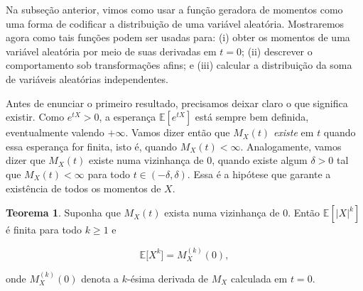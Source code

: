 \documentclass[12pt,portuguese]{article}
\theoremstyle{definition}
\newtheorem{theorem}{Teorema}
\theoremstyle{plainexercise}
\theoremstyle{starredexercise}
\theoremstyle{definition}
\begin{document}
Na subseção anterior, vimos como usar a função geradora de momentos como uma forma de
codificar a distribuição de uma variável aleatória. Mostraremos agora como tais funções
podem ser usadas para: (i) obter os momentos de uma variável aleatória por meio de suas derivadas em
$t=0$; (ii) descrever o comportamento sob transformações afins; e (iii) calcular a distribuição da soma de
variáveis aleatórias independentes.

Antes de enunciar o primeiro resultado, precisamos deixar claro o que significa
existir. Como $e^{tX}>0$, a esperança $\mathbb{E}[e^{tX}]$ está sempre bem
definida, eventualmente valendo $+\infty$. Vamos dizer então que $M_X(t)$
\emph{existe} em $t$ quando essa esperança for finita, isto é, quando
$M_X(t)<\infty$. Analogamente, vamos dizer que $M_X(t)$ existe numa vizinhança de $0$, 
quando existe algum  $\delta>0$ tal que $M_X(t)<\infty$ para todo $t\in(-\delta,\delta)$. Essa
é a hipótese que garante a existência de todos os momentos de $X$.

\begin{theorem}\label{thm:fgm-momentos}
Suponha que $M_X(t)$ exista numa vizinhança de $0$. Então $\mathbb{E}[|X|^k]$
é finita para todo $k\geqslant 1$ e

\begin{equation}\label{eq:fgm-momentos}
\mathbb{E}\bigl[X^k\bigr] = M_X^{(k)}(0),
\end{equation}

\noindent onde $M_X^{(k)}(0)$ denota a $k$-ésima derivada de $M_X$ calculada em
$t=0$.
\end{theorem}
\end{document}
